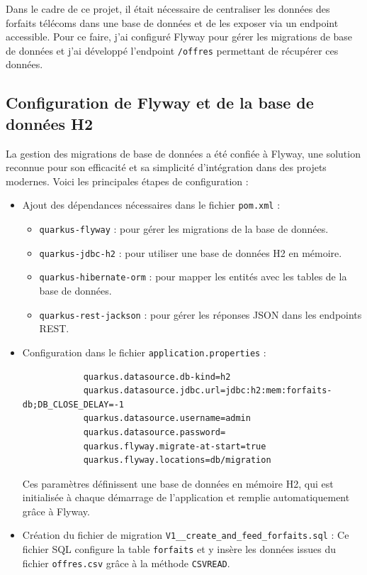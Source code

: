\documentclass{article}
\begin{document}
	Dans le cadre de ce projet, il était nécessaire de centraliser les données des forfaits télécoms dans une base de données et de les exposer via un endpoint accessible. Pour ce faire, j'ai configuré Flyway pour gérer les migrations de base de données et j'ai développé l'endpoint \texttt{/offres} permettant de récupérer ces données.
	
	\subsection{Configuration de Flyway et de la base de données H2}
	
	La gestion des migrations de base de données a été confiée à Flyway, une solution reconnue pour son efficacité et sa simplicité d'intégration dans des projets modernes. Voici les principales étapes de configuration :
	
	\begin{itemize}
		\item Ajout des dépendances nécessaires dans le fichier \texttt{pom.xml} :
		\begin{itemize}
			\item \texttt{quarkus-flyway} : pour gérer les migrations de la base de données.
			\item \texttt{quarkus-jdbc-h2} : pour utiliser une base de données H2 en mémoire.
			\item \texttt{quarkus-hibernate-orm} : pour mapper les entités avec les tables de la base de données.
			\item \texttt{quarkus-rest-jackson} : pour gérer les réponses JSON dans les endpoints REST.
		\end{itemize}
		
		\item Configuration dans le fichier \texttt{application.properties} :
		\begin{verbatim}
			quarkus.datasource.db-kind=h2
			quarkus.datasource.jdbc.url=jdbc:h2:mem:forfaits-db;DB_CLOSE_DELAY=-1
			quarkus.datasource.username=admin
			quarkus.datasource.password=
			quarkus.flyway.migrate-at-start=true
			quarkus.flyway.locations=db/migration
		\end{verbatim}
		
		Ces paramètres définissent une base de données en mémoire H2, qui est initialisée à chaque démarrage de l'application et remplie  automatiquement grâce à Flyway.
		
		\item Création du fichier de migration \texttt{V1\_\_create\_and\_feed\_forfaits.sql} :
		Ce fichier SQL configure la table \texttt{forfaits} et y insère les données issues du fichier \texttt{offres.csv} grâce à la méthode \texttt{CSVREAD}.
	\end{itemize}
	
\end{document}
